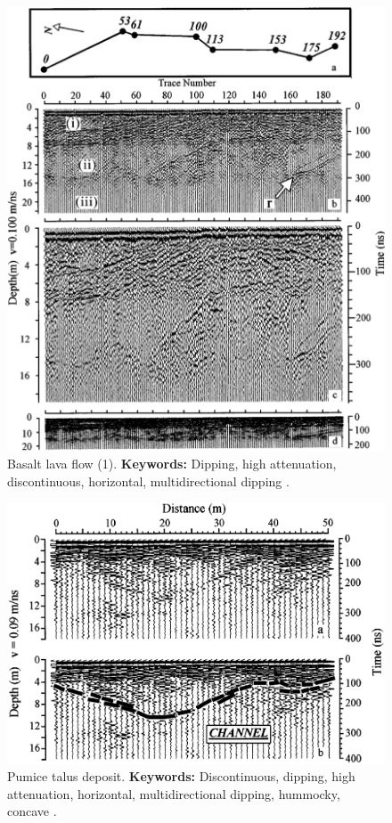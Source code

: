 \begin{figure}[h!]
    \centering
    \includegraphics[width=0.9\linewidth]{Figures/0.2GPR/Russel1996_volcanic_deposits_3.png}
    \caption[Basalt lava flow (2).]{Basalt lava flow (1). \textbf{Keywords: } Dipping, high attenuation, discontinuous, horizontal, multidirectional dipping \citep{Russell1997}.}
    \label{fig:Russel2017-3}
\end{figure}

\begin{landscape}
\begin{figure}[h!]
    \centering
    \includegraphics[width=0.9\linewidth]{Figures/0.2GPR/Russel1996_volcanic_deposits_5.png}
    \caption[Pumice talus deposit.]{Pumice talus deposit. \textbf{Keywords: } Discontinuous, dipping, high attenuation, horizontal, multidirectional dipping, hummocky, concave \citep{Russell1997}.}
    \label{fig:Russell1996-5}
\end{figure}
\end{landscape}
\clearpage